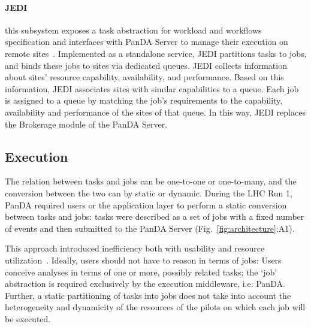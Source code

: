 \paragraph{\textbf{JEDI}} this subsystem exposes a task abstraction for workload
and workflows specification and interfaces with PanDA Server to manage their
execution on remote sites~\cite{borodin2015scaling}. Implemented as a standalone
service, JEDI partitions tasks to jobs, and binds these jobs to sites via
dedicated queues. JEDI collects information about sites' resource capability,
availability, and performance. Based on this information, JEDI associates sites
with similar capabilities to a queue. Each job is assigned to a queue by
matching the job's requirements to the capability, availability and performance
of the sites of that queue. In this way, JEDI replaces the Brokerage module of
the PanDA Server.


\subsection{Execution}
\label{ssec:panda_exec}


The relation between tasks and jobs can be one-to-one or one-to-many, and the
conversion between the two can by static or dynamic. During the LHC Run 1, PanDA
required users or the application layer to perform a static conversion between
tasks and jobs: tasks were described as a set of jobs with a fixed number of
events and then submitted to the PanDA Server (Fig.~\ref{fig:architecture}:A1).

This approach introduced inefficiency both with usability and resource
utilization~\cite{borodin2015unified}. Ideally, users should not have to reason
in terms of jobs: Users conceive analyses in terms of one or more, possibly
related tasks; the `job' abstraction is required exclusively by the execution
middleware, i.e. PanDA. Further, a static partitioning of tasks into jobs does
not take into account the heterogeneity and dynamicity of the resources of the
pilots on which each job will be executed.

